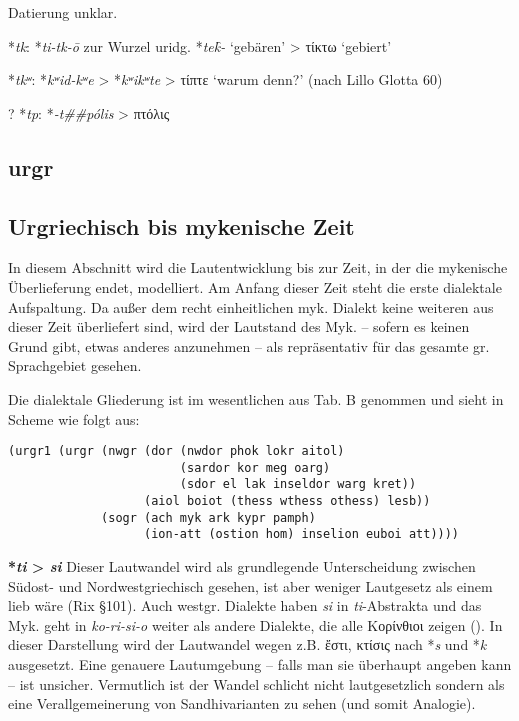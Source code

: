 \documentclass[12pt,a4paper,normalheadings]{scrartcl}
\newcounter{para}
\newcommand{\mypara}[1]{\vspace{1em}\par\noindent\refstepcounter{para}%
\textbf{\textsf{\thepara}}\enspace\textbf{#1}\quad}
\def\rek#1{*\textit{#1}}
\def\bel#1{\textit{#1}}
\begin{document}
Datierung unklar.

\lex{\rek{t(k, kʷ, p)}}{\rek{(k, kʷ, p)t}}

\rek{tk}: \rek{ti-tk-ō} zur Wurzel uridg. \rek{tek̑-} `gebären' > τίκτω `gebiert'

\rek{tkʷ}: \rek{kʷid-kʷe} > \rek{kʷikʷte} > τίπτε `warum denn?' (nach Lillo Glotta 60)

? \rek{tp}: \rek{-t\#\#pólis} > πτόλις

\subsection*{urgr}

\subsection{Urgriechisch bis mykenische Zeit}

In diesem Abschnitt wird die Lautentwicklung bis zur Zeit,
in der die mykenische Überlieferung endet, modelliert.
Am Anfang dieser Zeit steht die erste dialektale Aufspaltung.
Da außer dem recht einheitlichen myk. Dialekt keine weiteren aus dieser
Zeit überliefert sind,
wird der Lautstand des Myk.
-- sofern es keinen Grund gibt, etwas anderes anzunehmen --
als repräsentativ für das gesamte gr. Sprachgebiet gesehen.

Die dialektale Gliederung ist im wesentlichen aus \cite{bart_frueh}
Tab. B genommen und sieht in Scheme wie folgt aus:
\begin{verbatim}
(urgr1 (urgr (nwgr (dor (nwdor phok lokr aitol)
                        (sardor kor meg oarg)
                        (sdor el lak inseldor warg kret))
                   (aiol boiot (thess wthess othess) lesb))
             (sogr (ach myk ark kypr pamph)
                   (ion-att (ostion hom) inselion euboi att))))
\end{verbatim}

\mypara{\rek{ti} > \bel{si}}
Dieser Lautwandel wird als grundlegende Unterscheidung zwischen Südost-
und Nordwestgriechisch gesehen,
ist aber weniger Lautgesetz als einem lieb wäre (Rix §101).
Auch westgr. Dialekte haben \bel{si} in \emph{ti}-Abstrakta
und das Myk. geht in \bel{ko-ri-si-o} weiter als andere Dialekte,
die alle Κορίνθιοι zeigen (\cite[144]{bart_hand}).
In dieser Darstellung wird der Lautwandel wegen z.B. ἔστι, κτίσις
nach \rek{s} und \rek{k} ausgesetzt.
Eine genauere Lautumgebung -- falls man sie überhaupt angeben kann --
ist unsicher.
Vermutlich ist der Wandel schlicht nicht lautgesetzlich
sondern als eine Verallgemeinerung von Sandhivarianten zu sehen
(und somit Analogie).
\end{document}
